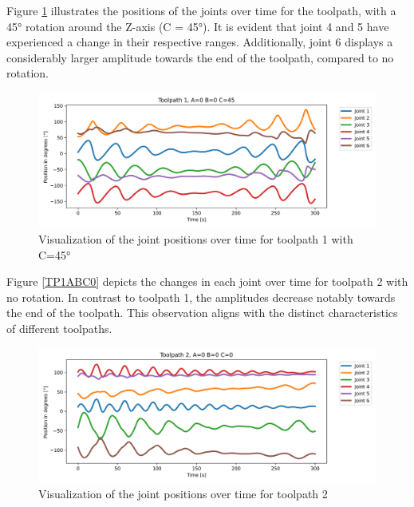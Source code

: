 Figure \ref{TP1ABC45} illustrates the positions of the joints over time for the toolpath, with a 45° rotation around the Z-axis (C = 45°). It is evident that joint 4 and 5 have experienced a change in their respective ranges. Additionally, joint 6 displays a considerably larger amplitude towards the end of the toolpath, compared to no rotation.

\begin{figure}[H]
	\centerline{\includegraphics[width=1\textwidth]{figures/TP1ABC45.png}}
	\caption{Visualization of the joint positions over time for toolpath 1 with C=45°}
	\label{TP1ABC45}
\end{figure}



Figure \ref{TP1ABC0} depicts the changes in each joint over time for toolpath 2 with no rotation. In contrast to toolpath 1, the amplitudes decrease notably towards the end of the toolpath. This observation aligns with the distinct characteristics of different toolpaths.
 
\begin{figure}[H]
	\centerline{\includegraphics[width=1\textwidth]{figures/TP2ABC0.png}}
	\caption{Visualization of the joint positions over time for toolpath 2}
	\label{TP2ABC0}
\end{figure}

